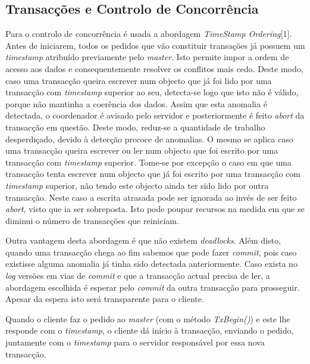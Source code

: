\subsection{Transacções e Controlo de Concorrência}

Para o controlo de concorrência é usada a abordagem \textit{TimeStamp Ordering}[1]. Antes de iniciarem, todos os pedidos que vão constituir transações já possuem um \textit{timestamp} atribuído previamente pelo \textit{master}. Isto permite impor a ordem de acesso aos dados e consequentemente resolver os conflitos mais cedo. Deste modo, caso uma transacção queira escrever num objecto que já foi lido por uma transacção com \textit{timestamp} superior ao seu, detecta-se logo que isto não é válido, porque não mantinha a coerência dos dados. Assim que esta anomalia é detectada, o coordenador é avisado pelo servidor e posteriormente é  feito \textit{abort} da transacção em questão. Deste modo, reduz-se a quantidade de trabalho desperdiçado, devido à detecção precoce de anomalias. O mesmo se aplica caso uma transacção queira escrever ou ler num objecto que foi escrito por uma transacção com \textit{timestamp} superior. Tome-se por excepção o caso em que uma transacção tenta escrever num objecto que já foi escrito por uma transacção com \textit{timestamp} superior, não tendo este objecto ainda ter sido lido por outra transacção. Neste caso a escrita atrasada pode ser ignorada ao invés de ser feito \textit{abort}, visto que ia ser sobreposta. Isto pode poupar recursos na medida em que se diminui o número de transacções que reiniciam.

Outra vantagem desta abordagem é que não existem \textit{deadlocks}. Além disto, quando uma transacção chega ao fim sabemos que pode fazer \textit{commit}, pois caso existisse alguma anomalia já tinha sido detectada anteriormente. Caso exista no \textit{log} versões em vias de \textit{commit} e que a transacção actual precisa de ler, a abordagem escolhida é esperar pelo \textit{commit} da outra transacção para prosseguir. Apesar da espera isto será transparente para o cliente.

Quando o cliente faz o pedido ao \textit{master} (com o método \textit{TxBegin()}) e este lhe responde com o \textit{timestamp}, o cliente  dá início à transacção, enviando o pedido, juntamente com o \textit{timestamp} para o servidor responsável por essa nova transacção. 

